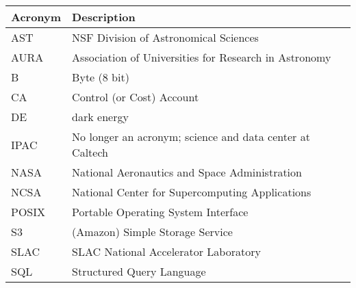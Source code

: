 \addtocounter{table}{-1}
\begin{longtable}{p{}p{}}\hline
\textbf{Acronym} & \textbf{Description}  \\\hline

AST & NSF Division of Astronomical Sciences \\\hline
AURA & Association of Universities for Research in Astronomy \\\hline
B & Byte (8 bit) \\\hline
CA & Control (or Cost) Account \\\hline
DE & dark energy \\\hline
IPAC & No longer an acronym; science and data center at Caltech \\\hline
NASA & National Aeronautics and Space Administration \\\hline
NCSA & National Center for Supercomputing Applications \\\hline
POSIX & Portable Operating System Interface \\\hline
S3 & (Amazon) Simple Storage Service  \\\hline
SLAC & SLAC National Accelerator Laboratory \\\hline
SQL & Structured Query Language \\\hline
\end{longtable}
